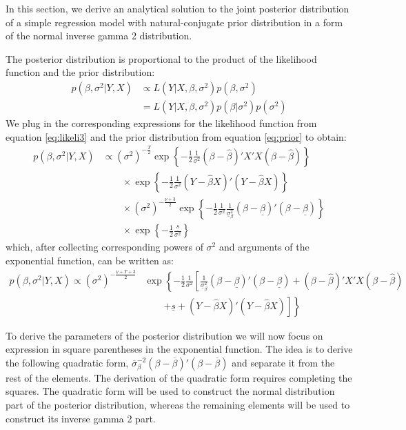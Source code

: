 \documentclass[
  letterpaper,
  DIV=11,
  numbers=noendperiod]{scrreprt}
\begin{document}
In this section, we derive an analytical solution to the joint posterior
distribution of a simple regression model with natural-conjugate prior
distribution in a form of the normal inverse gamma 2 distribution.

The posterior distribution is proportional to the product of the
likelihood function and the prior distribution: \begin{align}
p\left( \beta,\sigma^2|Y,X \right) &\propto L\left( Y|X,\beta,\sigma^2 \right)p\left( \beta,\sigma^2 \right)\\
&= L\left( Y|X,\beta,\sigma^2 \right)p\left( \beta|\sigma^2 \right)p\left( \sigma^2 \right)
\end{align} We plug in the corresponding expressions for the likelihood
function from equation \eqref{eq:likeli3} and the prior distribution
from equation \eqref{eq:prior} to obtain: \begin{align}
p\left( \beta,\sigma^2|Y,X \right) &\propto 
\left( \sigma^2 \right)^{-\frac{T}{2}}\exp\left\{ -\frac{1}{2}\frac{1}{\sigma^2} (\beta - \hat\beta)'X'X (\beta - \hat\beta) \right\}\\ 
&\qquad\times  \exp\left\{ -\frac{1}{2}\frac{1}{\sigma^2}  (Y-\hat\beta X)'(Y-\hat\beta X) \right\}\\
&\qquad\times \left(\sigma^2\right)^{-\frac{\underline{\nu}+3}{2}}\exp\left\{ -\frac{1}{2}\frac{1}{\sigma^2}\frac{1}{\underline{\sigma}_{\beta}^2}(\beta-\underline{\beta})'(\beta-\underline{\beta}) \right\}\\ 
&\qquad\times 
\exp\left\{ -\frac{1}{2}\frac{\underline{s}}{\sigma^2} \right\}
\end{align} which, after collecting corresponding powers of \(\sigma^2\)
and arguments of the exponential function, can be written as:
\begin{align}\label{eq:post-kernel}
p\left( \beta,\sigma^2|Y,X \right) \propto 
\left( \sigma^2 \right)^{-\frac{\underline{\nu}+T+3}{2}}&\exp\left\{ -\frac{1}{2}\frac{1}{\sigma^2} 
\left[ \frac{1}{\underline{\sigma}_{\beta}^2}(\beta-\underline{\beta})'(\beta-\underline{\beta}) + (\beta - \hat\beta)'X'X (\beta - \hat\beta)\right.\right.\\ 
&\qquad\left.\left.+ \underline{s} + (Y-\hat\beta X)'(Y-\hat\beta X) \right] \right\}
\end{align}

To derive the parameters of the posterior distribution we will now focus
on expression in square parentheses in the exponential function. The
idea is to derive the following quadratic form,
\(\overline{\sigma}_{\beta}^{-2}(\beta-\overline{\beta})'(\beta-\overline{\beta})\)
and separate it from the rest of the elements. The derivation of the
quadratic form requires completing the squares. The quadratic form will
be used to construct the normal distribution part of the posterior
distribution, whereas the remaining elements will be used to construct
its inverse gamma 2 part.
\end{document}
